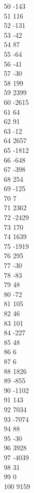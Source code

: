 { 50	-143 \\
 51	116 \\
 52	-131 \\
 53	-42 \\
 54	87 \\
 55	-64 \\
 56	-41 \\
 57	-30 \\
 58	199 \\
 59	2399 \\
 60	-2615 \\
 61	64 \\
 62	91 \\
 63	-12 \\
 64	2657 \\
 65	-1812 \\
 66	-648 \\
 67	-398 \\
 68	254 \\
 69	-125 \\
 70	7 \\
 71	2362 \\
 72	-2429 \\
 73	170 \\
 74	1639 \\
 75	-1919 \\
 76	295 \\
 77	-30 \\
 78	-83 \\
 79	48 \\
 80	-72 \\
 81	105 \\
 82	46 \\
 83	101 \\
 84	-227 \\
 85	48 \\
 86	6 \\
 87	6 \\
 88	1826 \\
 89	-855 \\
 90	-1102 \\
 91	143 \\
 92	7034 \\
 93	-7074 \\
 94	88 \\
 95	-30 \\
 96	3928 \\
 97	-4039 \\
 98	31 \\
 99	0 \\
 100	9159 \\
}
